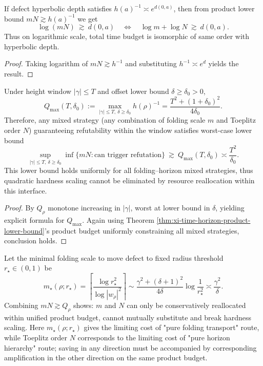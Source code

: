 \begin{proposition}\label{prop:xi-double-log-time-hyperbolic-additivity}
If defect hyperbolic depth satisfies
\(
h(a)^{-1}\asymp e^{d(0,a)}
\),
then from product lower bound \(mN\gtrsim h(a)^{-1}\) we get
\[
\log(mN)\ \gtrsim\ d(0,a)
\quad\Longleftrightarrow\quad
\log m+\log N\ \gtrsim\ d(0,a).
\]
Thus on logarithmic scale, total time budget is isomorphic of same order with hyperbolic depth.
\end{proposition}

\begin{proof}
Taking logarithm of \(mN\gtrsim h^{-1}\) and substituting \(h^{-1}\asymp e^{d}\) yields the result.
\end{proof}

\begin{theorem}\label{thm:xi-height-window-unified-quadratic-hardness}
Under height window \(|\gamma|\le T\) and offset lower bound \(\delta\ge\delta_0>0\),
\[
Q_{\max}(T,\delta_0)
:=\max_{|\gamma|\le T,\ \delta\ge\delta_0}h(\rho)^{-1}
=\frac{T^2+(1+\delta_0)^2}{4\delta_0}.
\]
Therefore, any mixed strategy (any combination of folding scale \(m\) and Toeplitz order \(N\)) guaranteeing refutability within the window satisfies worst-case lower bound
\[
\sup_{|\gamma|\le T,\ \delta\ge\delta_0}\inf\{mN:\text{can trigger refutation}\}
\ \gtrsim\
Q_{\max}(T,\delta_0)
\asymp
\frac{T^2}{\delta_0}.
\]
This lower bound holds uniformly for all folding--horizon mixed strategies, thus quadratic hardness scaling cannot be eliminated by resource reallocation within this interface.
\end{theorem}

\begin{proof}
By \(Q_\rho\) monotone increasing in \(|\gamma|\), worst at lower bound in \(\delta\), yielding explicit formula for \(Q_{\max}\).
Again using Theorem \ref{thm:xi-time-horizon-product-lower-bound}'s product budget uniformly constraining all mixed strategies, conclusion holds.
\end{proof}

\begin{proposition}\label{prop:xi-folding-scale-vs-toeplitz-order-nonsubstitutability}
Let the minimal folding scale to move defect to fixed radius threshold \(r_\star\in(0,1)\) be
\[
m_\star(\rho;r_\star)
=
\left\lceil
\frac{\log r_\star^2}{\log|w_\rho|^2}
\right\rceil
\sim
\frac{\gamma^2+(\delta+1)^2}{4\delta}\log\frac1{r_\star^2}
\asymp
\frac{\gamma^2}{\delta}.
\]
Combining \(mN\gtrsim Q_\rho\) shows: \(m\) and \(N\) can only be conservatively reallocated within unified product budget, cannot mutually substitute and break hardness scaling.
Here \(m_\star(\rho;r_\star)\) gives the limiting cost of "pure folding transport" route, while Toeplitz order \(N\) corresponds to the limiting cost of "pure horizon hierarchy" route; saving in any direction must be accompanied by corresponding amplification in the other direction on the same product budget.
\end{proposition}

